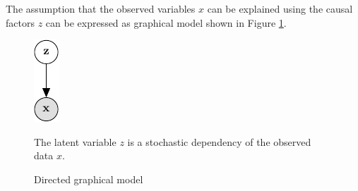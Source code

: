 



The assumption that the observed variables $x$ can be explained using the causal factors $z$ can be expressed as graphical model shown in Figure \ref{fig:dgm}.

\begin{figure}[htb]
\centering
\includegraphics{media/directed_graphical_model}
  \caption{Directed graphical model}
  \label{fig:dgm}
  \medskip
  \small
  The latent variable $z$ is a stochastic dependency of the observed data $x$.
\end{figure}


\newpage













